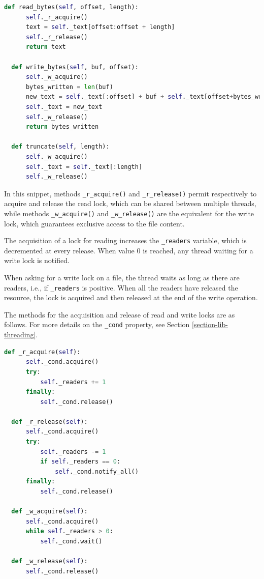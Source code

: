 \documentclass[a4paper,12pt,twoside,openright]{report}
\begin{document}
  \begin{lstlisting}[language=Python]
  def read_bytes(self, offset, length):
      self._r_acquire()
      text = self._text[offset:offset + length]
      self._r_release()
      return text

  def write_bytes(self, buf, offset):
      self._w_acquire()
      bytes_written = len(buf)
      new_text = self._text[:offset] + buf + self._text[offset+bytes_written:]
      self._text = new_text
      self._w_release()
      return bytes_written

  def truncate(self, length):
      self._w_acquire()
      self._text = self._text[:length]
      self._w_release()
  \end{lstlisting}

  In this snippet, methods \texttt{\_r\_acquire()} and \texttt{\_r\_release()} permit respectively
  to acquire and release the read lock, which can be shared between multiple threads,
  while methods \texttt{\_w\_acquire()} and \texttt{\_w\_release()} are the equivalent for the write lock,
  which guarantees exclusive access to the file content.
  
  The acquisition of a lock for reading increases the \texttt{\_readers} variable, which is decremented at every release.
  When value $0$ is reached, any thread waiting for a write lock is notified.
  
  When asking for a write lock on a file, the thread waits as long as there are readers, i.e.,
  if \texttt{\_readers} is positive. When all the readers have released the resource,
  the lock is acquired and then released at the end of the write operation.

  The methods for the acquisition and release of read and write locks are as follows.
  For more details on the \texttt{\_cond} property, see Section \ref{section-lib-threading}.

  \clearpage
  \begin{lstlisting}[language=Python]
  def _r_acquire(self):
      self._cond.acquire()
      try:
          self._readers += 1
      finally:
          self._cond.release()

  def _r_release(self):
      self._cond.acquire()
      try:
          self._readers -= 1
          if self._readers == 0:
              self._cond.notify_all()
      finally:
          self._cond.release()

  def _w_acquire(self):
      self._cond.acquire()
      while self._readers > 0:
          self._cond.wait()

  def _w_release(self):
      self._cond.release()
  \end{lstlisting}
\end{document}
